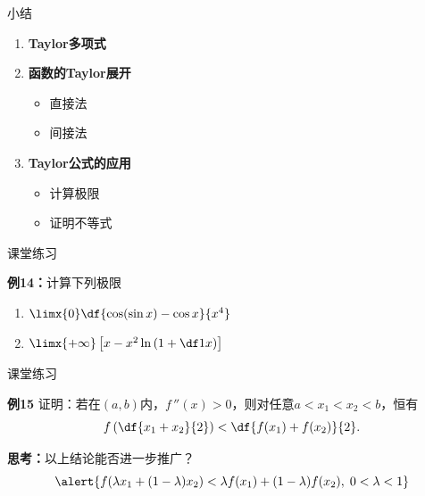 \begin{frame}[<+->]{小结}
	\linespread{1.5}
	\begin{enumerate}
	  \item {\bf Taylor多项式}
	  \item {\bf 函数的Taylor展开}
	  \begin{itemize}
	    \item 直接法
	    \item 间接法
	  \end{itemize}
	  \item {\bf Taylor公式的应用}
	  \begin{itemize}
	    \item 计算极限
	    \item 证明不等式
	  \end{itemize}
	\end{enumerate}
\end{frame}

\begin{frame}{课堂练习}
	\linespread{2}
	\begin{exampleblock}{{\bf 例14：}计算下列极限\hfill}
		\begin{enumerate}
		  \item $\limx{0}\df{\cos(\sin x)-\cos x}{x^4}$
		  \item $\limx{+\infty}\left[x-x^2\ln\left(1+\df 1x\right)\right]$
		\end{enumerate}
	\end{exampleblock}
\end{frame}

\begin{frame}{课堂练习}
	\linespread{1.2}
	\begin{exampleblock}{{\bf 例15}\hfill}
		证明：若在$(a,b)$内，$f\,''(x)>0$，则对任意$a<x_1<x_2<b$，恒有
		$$f\left(\df{x_1+x_2}{2}\right)<\df{f(x_1)+f(x_2)}{2}.$$
	\end{exampleblock}\pause 
	{\bf 思考：}以上结论能否进一步推广？\pause 
	$$\alert{f(\lambda x_1+(1-\lambda)x_2)<\lambda
	f(x_1)+(1-\lambda)f(x_2),\;0<\lambda<1}$$
\end{frame}


